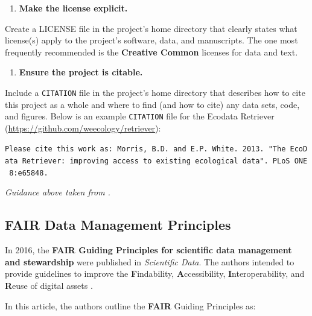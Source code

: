 \documentclass[
]{book}
\providecommand{\tightlist}{%
  \setlength{\itemsep}{0pt}\setlength{\parskip}{0pt}}
\begin{document}
\begin{enumerate}
\def\labelenumi{\arabic{enumi}.}
\setcounter{enumi}{3}
\tightlist
\item
  \textbf{Make the license explicit.}
\end{enumerate}

Create a LICENSE file in the project's home directory that clearly states what license(s) apply to the project's software, data, and manuscripts. The one most frequently recommended is the \textbf{Creative Common} licenses for data and text.

\begin{enumerate}
\def\labelenumi{\arabic{enumi}.}
\setcounter{enumi}{4}
\tightlist
\item
  \textbf{Ensure the project is citable.}
\end{enumerate}

Include a \texttt{CITATION} file in the project's home directory that describes how to cite this project as a whole and where to find (and how to cite) any data sets, code, and figures. Below is an example \texttt{CITATION} file for the Ecodata Retriever (\url{https://github.com/weecology/retriever}):

\texttt{Please\ cite\ this\ work\ as:\ Morris,\ B.D.\ and\ E.P.\ White.\ 2013.\ "The\ EcoData\ Retriever:\ improving\ access\ to\ existing\ ecological\ data".\ PLoS\ ONE\ 8:e65848.}

\emph{Guidance above taken from \citet{Wilson_2017}.}

\hypertarget{fair-data-management-principles}{%
\subsection{FAIR Data Management Principles}\label{fair-data-management-principles}}

In 2016, the \textbf{FAIR Guiding Principles for scientific data management and stewardship} were published in \emph{Scientific Data}. The authors intended to provide guidelines to improve the \textbf{F}indability, \textbf{A}ccessibility, \textbf{I}nteroperability, and \textbf{R}euse of digital assets \citep{Wilkinson_2016}.

In this article, the authors outline the \textbf{FAIR} Guiding Principles as:
\end{document}
